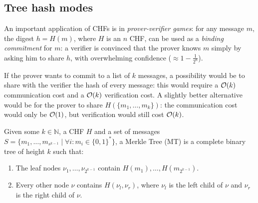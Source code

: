 \subsection{Tree hash modes}
An important application of CHFs is in \emph{prover-verifier games}:
for any message \(m\), the digest \(h = H(m)\), where \(H\) is an \(n\) CHF, can be
used as a \emph{binding commitment} for \(m\): a verifier is convinced that the prover knows \(m\)
simply by asking him to share \(h\), with overwhelming confidence (\(\approx 1 - \frac{1}{2^n}\)).

If the prover wants to commit to a list of \(k\) messages, a possibility would be to share with the
verifier the hash of every message: this would require a \(\mathcal{O}(k)\) communication cost and a
\(\mathcal{O}(k)\) verification cost.
A slightly better alternative would be for the prover to share \(H(\{m_1, \dots, m_k\})\): the
communication cost would only be \(\mathcal{O}(1)\), but verification would still cost \(\mathcal{O}(k)\).
\begin{definition}
	Given some \(k \in \mathbb{N}\), a CHF \(H\) and a set of messages
	\(S = \{m_1, \dots, m_{s^{k-1}} \mid \forall i\colon m_i \in {\{0, 1\}}^*\} \),
	a Merkle Tree (MT) is a complete binary tree of height \(k\) such that:
	\begin{enumerate}
		\item The leaf nodes \(\nu_1, \dots, \nu_{2^{k-1}}\) contain \(H(m_1), \dots,
		      H(m_{2^{k-1}})\).
		\item Every other node \(\nu \) contains \(H(\nu_l, \nu_r)\), where \(\nu_l\) is the left
		      child of \(\nu \) and \(\nu_r\) is the right child of \(\nu \).
	\end{enumerate}
\end{definition}

